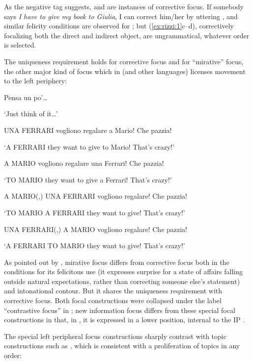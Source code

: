 \documentclass[output=paper]{LSP/langsci}
\begin{document}
As the negative tag suggests,  and  are instances of corrective focus. If somebody says \textit{I have to give my book to Giulia}, I can correct him/her by uttering , and similar felicity conditions are observed for ; but (\ref{ex:rizzi:1}c--d), correctively focalizing both the direct and indirect object, are ungrammatical, whatever order is selected.   

The uniqueness requirement holds for corrective focus and for “mirative” focus, the other major kind of focus which in  (and other  languages) licenses movement to the left periphery:

\ea%
    \label{ex:rizzi:2}
 
	 Pensa un po’…

\glt      ‘Just think of it…'

\ea   UNA FERRARI vogliono regalare a Mario! Che pazzia!

 \glt ‘A FERRARI they want to give to Mario! That’s crazy!'

\ex  A MARIO vogliono regalare una Ferrari! Che pazzia!

\glt ‘TO MARIO they want to give a Ferrari! That’s crazy!'

\ex * A MARIO(,) UNA FERRARI vogliono regalare! Che pazzia!

 \glt ‘TO MARIO A FERRARI they want to give! That’s crazy!’

\ex * UNA FERRARI(,) A MARIO vogliono regalare! Che pazzia!      

\glt ‘A FERRARI TO MARIO they want to give! That’s crazy!'
\z
\z

As pointed out by \citet{BianchiEtAl2015}, mirative focus differs from corrective focus both in the  conditions for its felicitous use (it expresses surprise for a state of affairs falling outside natural expectations, rather than correcting someone else’s statement) and  intonational contour. But it shares the uniqueness requirement with corrective focus. Both focal constructions were collapsed under the label “contrastive focus” in \citet{Rizzi1997}; new information focus differs from these special focal constructions in that, in , it is expressed in a lower position, internal to the IP  \citep{Belletti2004}.

The special left peripheral focus constructions sharply contrast with topic constructions such as , which is consistent with a proliferation of topics in any order:
\end{document}
